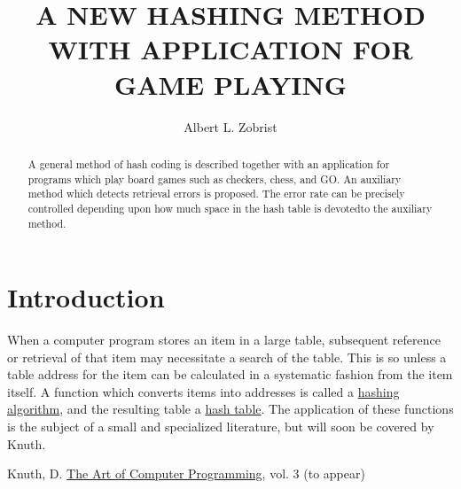 \documentclass{article}
\begin{document}
\title{A NEW HASHING METHOD WITH APPLICATION FOR GAME PLAYING}
\author{Albert L. Zobrist}
\maketitle

\begin{abstract}
A general method of hash coding is described together with an application for
programs which play board games such as checkers, chess, and GO. An auxiliary
method which detects retrieval errors is proposed. The error rate can be
precisely controlled depending upon how much space in the hash table is
devotedto the auxiliary method.
\end{abstract}

\section*{Introduction}

When a computer program stores an item in a large table, subsequent reference
or retrieval of that item may necessitate a search of the table. This is so
unless a table address for the item can be calculated in a systematic fashion
from the item itself. A function which converts items into addresses is called a \underline{hashing algorithm}, and the resulting table a \underline{hash table}. The application of these functions is the subject of a small and specialized literature, but will soon be covered by Knuth\cite{knuth}.

\begin{thebibliography}{9}
Knuth, D. \underline{The Art of Computer Programming}, vol. 3 (to appear)
\end{thebibliography}
\end{document}
